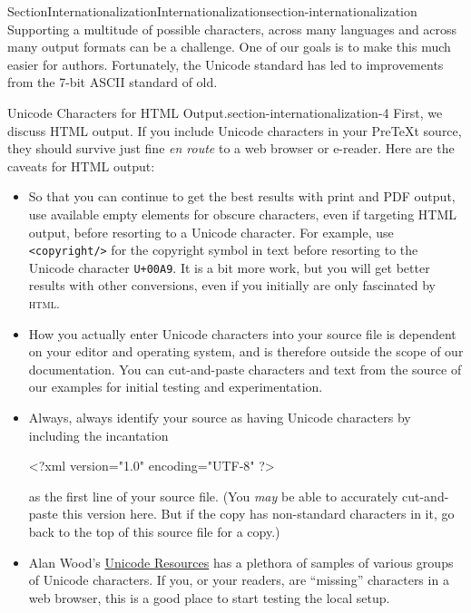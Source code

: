 \documentclass[twoside,10pt,]{article}
\newcommand{\mono}[1]{\texttt{#1}}
\newcommand{\initialism}[1]{\textsc{\MakeLowercase{#1}}}
\numberwithin{equation}{section}
\begin{document}
\begin{sectionptx}{Section}{Internationalization}{}{Internationalization}{}{}{section-internationalization}
%
Supporting a multitude of possible characters, across many languages and across many output formats can be a challenge.  One of our goals is to make this much easier for authors.  Fortunately, the Unicode standard has led to improvements from the 7-bit ASCII standard of old.%
\begin{paragraphs}{Unicode Characters for HTML Output.}{section-internationalization-4}%
First, we discuss HTML output.  If you include Unicode characters in your PreTeXt source, they should survive just fine \textit{en route} to a web browser or e-reader.  Here are the caveats for HTML output:%
\begin{itemize}[label=\textbullet]
\item{}So that you can continue to get the best results with print and PDF output, use available empty elements for obscure characters, even if targeting HTML output, before resorting to a Unicode character.  For example, use \mono{<copyright/>} for the copyright symbol in text before resorting to the Unicode character \mono{U+00A9}.  It is a bit more work, but you will get better results with other conversions, even if you initially are only fascinated by \initialism{HTML}.%
\item{}How you actually enter Unicode characters into your source file is dependent on your editor and operating system, and is therefore outside the scope of our documentation.  You can cut-and-paste characters and text from the source of our examples for initial testing and experimentation.%
\item{}Always, always identify your source as having Unicode characters by including the incantation%
\begin{codedisplay}
<?xml version="1.0" encoding="UTF-8" ?>
\end{codedisplay}
as the first line of your source file. (You \emph{may} be able to accurately cut-and-paste this version here.  But if the copy has non-standard characters in it, go back to the top of this source file for a copy.)%
\item{}Alan Wood’s \href{http://www.alanwood.net/unicode/unicode_samples.html}{Unicode Resources} has a plethora of samples of various groups of Unicode characters.  If you, or your readers, are ``missing'' characters in a web browser, this is a good place to start testing the local setup.%
\end{itemize}

\end{paragraphs}
\end{sectionptx}
\end{document}
